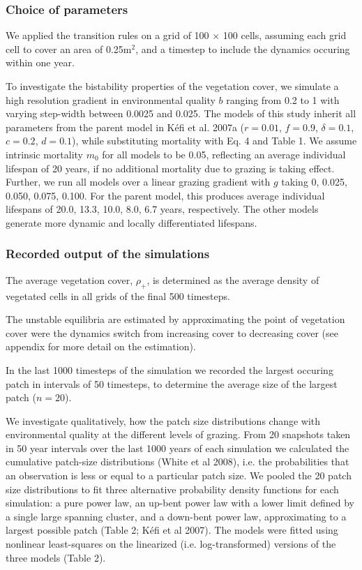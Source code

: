 \subsubsection{Choice of parameters}
We applied the transition rules on a grid of 100 $\times$ 100 cells, assuming each grid cell to cover an area of 0.25m$^2$, and a timestep to include the dynamics occuring within one year. 

To investigate the bistability properties of the vegetation cover, we simulate a high resolution gradient in environmental quality $b$ ranging from 0.2 to 1 with varying step-width between 0.0025 and 0.025. The models of this study inherit all parameters from the parent model in K\'efi et al. 2007a ($r = 0.01$, $f = 0.9$, $\delta = 0.1$, $c = 0.2$, $d = 0.1$), while substituting mortality with Eq. 4 and Table 1. We assume intrinsic mortality $m_0$ for all models to be 0.05, reflecting an average individual lifespan of 20 years, if no additional mortality due to grazing is taking effect.  
Further, we run all models over a linear grazing gradient with $g$ taking 0, 0.025, 0.050, 0.075, 0.100.
For the parent model, this produces average individual lifespans of 20.0, 13.3, 10.0, 8.0, 6.7 years, respectively. The other models generate more dynamic and locally differentiated lifespans.

\subsubsection{Recorded output of the simulations}

The average vegetation cover, $\rho_+$, %
is determined as the average density of vegetated cells in all grids of the final 500 timesteps.

The unstable equilibria are estimated by approximating the point of vegetation cover were the dynamics switch from increasing cover to decreasing cover (see appendix for more detail on the estimation). 

In the last 1000 timesteps of the simulation we recorded the largest occuring patch in intervals of 50 timesteps, to determine the average size of the largest patch ($n = 20$).

We investigate qualitatively, how the patch size distributions change with environmental quality at the different levels of grazing. 
From 20 snapshots taken in 50 year intervals over the last 1000 years of each simulation we calculated the cumulative patch-size distributions (White et al 2008), i.e. the probabilities that an observation is less or equal to a particular patch size. We pooled the 20 patch size distributions to fit three alternative probability density functions for each simulation: a pure power law, an up-bent power law with a lower limit defined by a single large spanning cluster, and a down-bent power law, approximating to a largest possible patch (Table 2; Kéfi et al 2007).
The models were fitted using nonlinear least-squares on the linearized (i.e. log-transformed) versions of the three models (Table 2).

